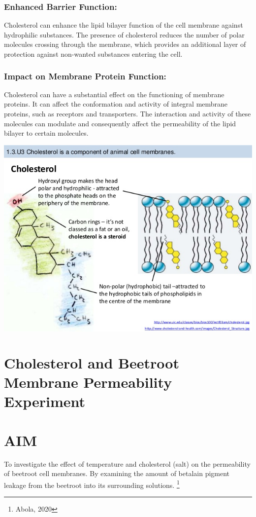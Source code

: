 \documentclass[a4paper,12pt,twoside,english]{all-in-one} %
\begin{document}
\subsubsection{Enhanced Barrier Function:}
Cholesterol can enhance the lipid bilayer function of the cell membrane against hydrophilic substances. The presence of cholesterol reduces the number of polar molecules crossing through the membrane, which provides an additional layer of protection against non-wanted substances entering the cell. 

\subsubsection{Impact on Membrane Protein Function:}
Cholesterol can have a substantial effect on the functioning of membrane proteins. It can affect the conformation and activity of integral membrane proteins, such as receptors and transporters. The interaction and activity of these molecules can modulate and consequently affect the permeability of the lipid bilayer to certain molecules.

\includegraphics[scale=0.7]{images/5.jpg}

\newpage

\section{Cholesterol and Beetroot Membrane Permeability Experiment}
\section{AIM}
To investigate the effect of temperature and cholesterol (salt) on the permeability of beetroot cell membranes. By examining the amount of betalain pigment leakage from the beetroot into its surrounding solutions. \footnote{Abola, 2020}
\end{document}
